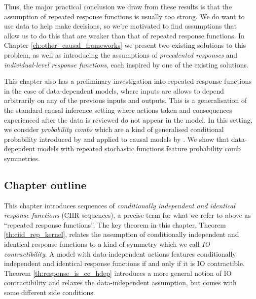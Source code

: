 Thus, the major practical conclusion we draw from these results is that the assumption of repeated response functions is usually too strong. We do want to use data to help make decisions, so we're motivated to find assumptions that allow us to do this that are weaker than that of repeated response functions. In Chapter \ref{ch:other_causal_frameworks} we present two existing solutions to this problem, as well as introducing the assumptions of \emph{precedented responses} and \emph{individual-level response functions}, each inspired by one of the existing solutions.

This chapter also has a preliminary investigation into repeated response functions in the case of data-dependent models, where inputs are allows to depend arbitrarily on any of the previous inputs and outputs. This is a generalisation of the standard causal inference setting where actions taken and consequences experienced after the data is reviewed do not appear in the model. In this setting, we consider \emph{probability combs} which are a kind of generalised conditional probability introduced by \citet{chiribella_quantum_2008} and applied to causal models by \citet{jacobs_causal_2019}. We show that data-dependent models with repeated stochastic functions feature probability comb symmetries. 

\subsection{Chapter outline}

This chapter introduces sequences of \emph{conditionally independent and identical response functions} (CIIR sequences), a precise term for what we refer to above as ``repeated response functions''. The key theorem in this chapter, Theorem \ref{th:ciid_rep_kernel}, relates the assumption of conditionally independent and identical response functions to a kind of symmetry which we call \emph{IO contractibility}. A model with data-independent actions features conditionally independent and identical response functions if and only if it is IO contractible. Theorem \ref{th:response_is_cc_hdep} introduces a more general notion of IO contractibility and relaxes the data-independent assumption, but comes with some different side conditions.

